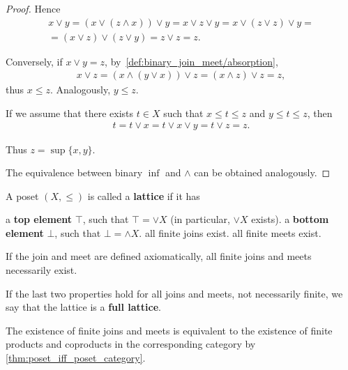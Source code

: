 \begin{proof}
  Hence
  \begin{align*}
    x \lor y = (x \lor (z \land x)) \lor y = x \lor z \lor y = x \lor (z \lor z) \lor y = \\ = (x \lor z) \lor (z \lor y) = z \lor z = z.
  \end{align*}

  Conversely, if \( x \lor y = z \), by~\ref{def:binary_join_meet/absorption},
  \begin{align*}
    x \lor z = (x \land (y \lor x)) \lor z = (x \land z) \lor z = z,
  \end{align*}
  thus \( x \leq z \). Analogously, \( y \leq z \).

  If we assume that there exists \( t \in X \) such that \( x \leq t \leq z \) and \( y \leq t \leq z \), then
  \begin{align*}
    t = t \lor x = t \lor x \lor y = t \lor z = z.
  \end{align*}

  Thus \( z = \sup \{ x, y \} \).

  The equivalence between binary \( \inf \) and \( \land \) can be obtained analogously.
\end{proof}

\begin{definition}\label{def:lattice}
  A poset \( (X, \leq) \) is called a \textbf{lattice} if it has
  \begin{description}
     a \textbf{top element} \( \top \), such that \( \top = \lor X \) (in particular, \( \lor X \) exists).
     a \textbf{bottom element} \( \bot \), such that \( \bot = \land X \).
     all finite joins exist.
     all finite meets exist.
  \end{description}

  If the join and meet are defined axiomatically, all finite joins and meets necessarily exist.

  If the last two properties hold for all joins and meets, not necessarily finite, we say that the lattice is a \textbf{full lattice}.
\end{definition}

\begin{note}\label{def:lattice_categorical_product}
  The existence of finite joins and meets is equivalent to the existence of finite products and coproducts in the corresponding category by \cref{thm:poset_iff_poset_category}.
\end{note}

